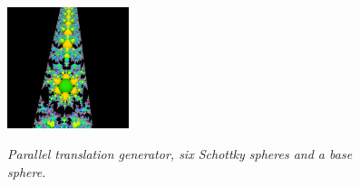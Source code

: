 \begin{figure}[h!tbp]
\begin{minipage}[t]{0.5\hsize}
  \hspace*{\fill}
 \begin{minipage}{0.25\hsize}
  \center
  \includegraphics[width=1.4in, height=1.4in, keepaspectratio]{./img/application/3dGen/translationOrbit.pdf}
    \label{fig:translation3dOrb}
 \end{minipage}
  \hspace*{\fill}
  \caption{\textit{Parallel translation generator, six Schottky spheres
  and a base sphere.}}
  \label{fig:translation3d}
 \end{minipage}
\end{figure}

